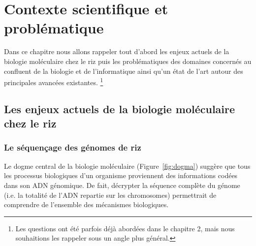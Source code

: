 \chapter{Contexte scientifique et problématique} %

\label{Perspectives} %

Dans ce chapitre nous allons rappeler tout d'abord les enjeux actuels de la biologie moléculaire chez le riz puis les problématiques des domaines concernés au confluent de la biologie et de l'informatique ainsi qu'un état de l'art autour des principales avancées existantes.
\footnote{Les questions ont été parfois déjà abordées dans le chapitre 2, mais nous souhaitions les rappeler sous un angle plus général.}




\section{Les enjeux actuels de la biologie moléculaire chez le riz}
\subsection{Le séquençage des génomes de riz}
Le dogme central de la biologie moléculaire (Figure~\ref{fig:dogma}) suggère que tous les processus biologiques d'un organisme proviennent des informations codées dans son ADN génomique. De fait, décrypter la séquence complète du génome (i.e. la totalité de l'ADN repartie sur les chromosomes) permettrait de comprendre de l'ensemble des mécanismes biologiques.\\

